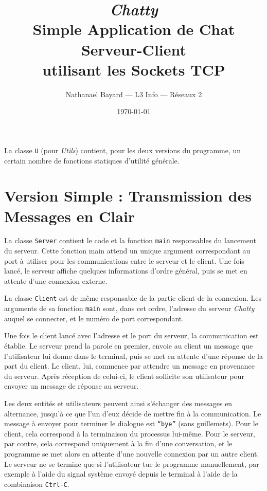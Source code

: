 \documentclass[a4paper,12pt]{article}
\author{Nathanael Bayard --- L3 Info --- Réseaux 2}
\title{\emph{Chatty} \\ Simple Application de Chat Serveur-Client \\ utilisant les Sockets TCP}
\date{\today}
\newcommand{\nopagenum}{\thispagestyle{empty}}
\newcommand{\code}[1]{\texttt{#1}}
\begin{document}
 \maketitle \nopagenum

    La classe \code{U} (pour \emph{Utils}) contient, pour les deux versions du programme, un certain nombre de fonctions statiques d'utilité générale.
    
    \section{Version Simple : Transmission des Messages en Clair}
    
    La classe \code{Server} contient le code et la fonction \code{main} responsables du lancement du serveur. Cette fonction main attend un unique argument correspondant au port à utiliser pour les communications entre le serveur et le client. Une fois lancé, le serveur affiche quelques informations d'ordre général, puis se met en attente d'une connexion externe.
    
    La classe \code{Client} est de même responsable de la partie client de la connexion. Les arguments de sa fonction \code{main} sont, dans cet ordre, l'adresse du serveur \emph{Chatty} auquel se connecter, et le numéro de port correspondant.
    
    Une fois le client lancé avec l'adresse et le port du serveur, la communication est établie. Le serveur prend la parole en premier, envoie au client un message que l'utilisateur lui donne dans le terminal, puis se met en attente d'une réponse de la part du client. Le client, lui, commence par attendre un message en provenance du serveur. Après réception de celui-ci, le client sollicite son utilisateur pour envoyer un message de réponse au serveur.
    
    Les deux entités et utilisateurs peuvent ainsi s'échanger des messages en alternance, jusqu'à ce que l'un d'eux décide de mettre fin à la communication. Le message à envoyer pour terminer le dialogue est \code{``bye''} (sans guillemets). Pour le client, cela correspond à la terminaison du processus lui-même. Pour le serveur, par contre, cela correspond uniquement à la fin d'une conversation, et le programme se met alors en attente d'une nouvelle connexion par un autre client. Le serveur ne se termine que si l'utilisateur tue le programme manuellement, par exemple à l'aide du signal système envoyé depuis le terminal à l'aide de la combinaison \code{Ctrl-C}.
    
\end{document}
